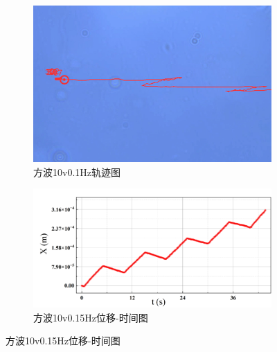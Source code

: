 \documentclass[a4paper]{report} %
\begin{document}
\begin{figure}[H]
    \begin{subfigure}{0.3\textwidth}
        \includegraphics[width=\linewidth]{10v0.1Hz.png}
        \caption{方波10v0.1Hz轨迹图}
    \end{subfigure}
    \begin{subfigure}{0.6\textwidth}
        \includegraphics[width=\linewidth]{10v0.1Hz1.png}
        \caption{方波10v0.15Hz位移-时间图}
    \end{subfigure}


\end{figure}
\end{document}
